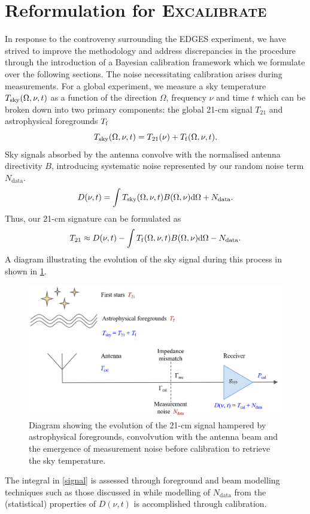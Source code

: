 \section{Reformulation for \textsc{Excalibrate}}\label{sec:reach_formalism}
 In response to the controversy surrounding the EDGES experiment, we have strived to improve the methodology and address discrepancies in the procedure through the introduction of a Bayesian calibration framework which we formulate over the following sections. The noise necessitating calibration arises during measurements. For a global experiment, we measure a sky temperature $T_{\mathrm{sky}}(\Omega, \nu, t)$ as a function of the direction $\Omega$, frequency $\nu$ and time $t$ which can be broken down into two primary components: the global 21-cm signal $T_{21}$ and astrophysical foregrounds $T_{\mathrm{f}}$
\begin{equation}
    \label{tsky}
    T_{\mathrm{sky}}(\Omega, \nu, t) = T_{21}(\nu) + T_{\mathrm{f}}(\Omega, \nu, t).
\end{equation}
Sky signals absorbed by the antenna convolve with the normalised antenna directivity $B$, introducing systematic noise represented by our random noise term $N_{\mathrm{data}}$.
\begin{equation}\label{eqn:bayestsource}
    D(\nu, t) = \int T_{\mathrm{sky}}(\Omega, \nu, t) B(\Omega, \nu)\mathrm{d}\Omega + N_{\mathrm{data}}.
\end{equation}
Thus, our 21-cm signature can be formulated as
\begin{equation}\label{signal}
  T_{21} \approx D(\nu, t) - \int T_{\mathrm{f}}(\Omega, \nu, t)B(\Omega, \nu)\mathrm{d}\Omega - N_{\mathrm{data}}.
\end{equation}
A diagram illustrating the evolution of the sky signal during this process in shown in \cref{fig:nsfig}.
\begin{figure}
    \centering
    \includegraphics[width=.7\textwidth]{nsdiag}
    \caption{Diagram showing the evolution of the 21-cm signal hampered by astrophysical foregrounds, convolvution with the antenna beam and the emergence of measurement noise before calibration to retrieve the sky temperature.}
    \label{fig:nsfig}
\end{figure}
The integral in \cref{signal} is assessed through foreground and beam modelling techniques such as those discussed in \citet{dom} while modelling of $N_{\mathrm{data}}$ from the (statistical) properties of $D(\nu, t)$ is accomplished through calibration.

